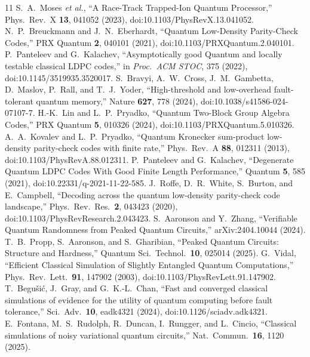 \documentclass[aps,prapplied,reprint,longbibliography]{revtex4-2}
\begin{document}
\begin{thebibliography}{11}
 S.~A.~Moses \emph{et al.}, ``A Race-Track Trapped-Ion Quantum Processor,'' Phys.\ Rev.\ X \textbf{13}, 041052 (2023), doi:10.1103/PhysRevX.13.041052.
 N.~P.~Breuckmann and J.~N.~Eberhardt, ``Quantum Low-Density Parity-Check Codes,'' PRX Quantum \textbf{2}, 040101 (2021), doi:10.1103/PRXQuantum.2.040101.
 P.~Panteleev and G.~Kalachev, ``Asymptotically good Quantum and locally testable classical LDPC codes,'' in \emph{Proc.\ ACM STOC}, 375 (2022), doi:10.1145/3519935.3520017.
 S.~Bravyi, A.~W.~Cross, J.~M.~Gambetta, D.~Maslov, P.~Rall, and T.~J.~Yoder, ``High-threshold and low-overhead fault-tolerant quantum memory,'' Nature \textbf{627}, 778 (2024), doi:10.1038/s41586-024-07107-7.
 H.-K.~Lin and L.~P.~Pryadko, ``Quantum Two-Block Group Algebra Codes,'' PRX Quantum \textbf{5}, 010326 (2024), doi:10.1103/PRXQuantum.5.010326.
 A.~A.~Kovalev and L.~P.~Pryadko, ``Quantum Kronecker sum-product low-density parity-check codes with finite rate,'' Phys.\ Rev.\ A \textbf{88}, 012311 (2013), doi:10.1103/PhysRevA.88.012311.
 P.~Panteleev and G.~Kalachev, ``Degenerate Quantum LDPC Codes With Good Finite Length Performance,'' Quantum \textbf{5}, 585 (2021), doi:10.22331/q-2021-11-22-585.
 J.~Roffe, D.~R.~White, S.~Burton, and E.~Campbell, ``Decoding across the quantum low-density parity-check code landscape,'' Phys.\ Rev.\ Res.\ \textbf{2}, 043423 (2020), doi:10.1103/PhysRevResearch.2.043423.
 S.~Aaronson and Y.~Zhang, ``Verifiable Quantum Randomness from Peaked Quantum Circuits,'' arXiv:2404.10044 (2024).
 T.~B.~Propp, S.~Aaronson, and S.~Gharibian, ``Peaked Quantum Circuits: Structure and Hardness,'' Quantum Sci.\ Technol.\ \textbf{10}, 025014 (2025).
 G.~Vidal, ``Efficient Classical Simulation of Slightly Entangled Quantum Computations,'' Phys.\ Rev.\ Lett.\ \textbf{91}, 147902 (2003), doi:10.1103/PhysRevLett.91.147902.
 T.~Begu\v{s}i\'{c}, J.~Gray, and G.~K.-L.~Chan, ``Fast and converged classical simulations of evidence for the utility of quantum computing before fault tolerance,'' Sci.\ Adv.\ \textbf{10}, eadk4321 (2024), doi:10.1126/sciadv.adk4321.
 E.~Fontana, M.~S.~Rudolph, R.~Duncan, I.~Rungger, and L.~Cincio, ``Classical simulations of noisy variational quantum circuits,'' Nat.\ Commun.\ \textbf{16}, 1120 (2025).
\end{thebibliography}
\end{document}
